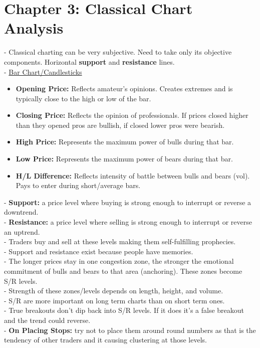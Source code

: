 \documentclass[12pt,fullpage]{article}
\begin{document}
\section*{Chapter 3: Classical Chart Analysis}
- Classical charting can be very subjective. Need to take only its objective components. Horizontal \textbf{support} and \textbf{resistance} lines.\\
- \underline{Bar Chart/Candlesticks}
\begin{itemize}
   \itemsep0em
   \item \textbf{Opening Price:} Reflects amateur's opinions. Creates extremes and is typically close to the high or low of the bar.
   \item \textbf{Closing Price:} Reflects the opinion of professionals. If prices closed higher than they opened pros are bullish, if closed lower pros were bearish.
   \item \textbf{High Price:} Represents the maximum power of bulls during that bar. 
   \item \textbf{Low Price:} Represents the maximum power of bears during that bar.
   \item \textbf{H/L Difference:} Reflects intensity of battle between bulls and bears (vol). Pays to enter during short/average bars.
\end{itemize}
- \textbf{Support:} a price level where buying is strong enough to interrupt or reverse a downtrend.\\
- \textbf{Resistance:} a price level where selling is strong enough to interrupt or reverse an uptrend.\\
- Traders buy and sell at these levels making them self-fulfilling prophecies.\\
- Support and resistance exist because people have memories.\\
- The longer prices stay in one congestion zone, the stronger the emotional commitment of bulls and bears to that area (anchoring). These zones become S/R levels.\\
- Strength of these zones/levels depends on length, height, and volume.\\
- S/R are more important on long term charts than on short term ones.\\
- True breakouts don't dip back into S/R levels. If it does it's a false breakout and the trend could reverse.\\
- \textbf{On Placing Stops:} try not to place them around round numbers as that is the tendency of other traders and it causing clustering at those levels.\\
\end{document}
